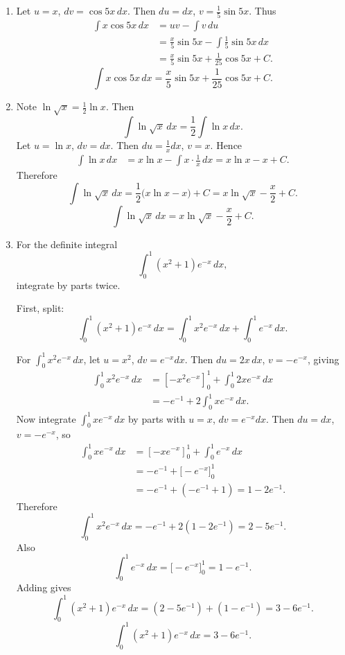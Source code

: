 \documentclass[12pt]{article}
\begin{document}
\begin{enumerate}[label=(\alph*)]
\item Let \(u=x\), \(dv=\cos 5x\,dx\). Then \(du=dx\), \(v=\frac{1}{5}\sin 5x\). Thus
\begin{align*}
\int x\cos 5x\,dx
&= uv-\int v\,du\\
&= \frac{x}{5}\sin 5x - \int \frac{1}{5}\sin 5x\,dx\\
&= \frac{x}{5}\sin 5x + \frac{1}{25}\cos 5x + C.
\end{align*}
\[
\boxed{\displaystyle \int x\cos 5x\,dx = \frac{x}{5}\sin 5x + \frac{1}{25}\cos 5x + C.}
\]

\item Note \(\ln\sqrt{x}=\frac12\ln x\). Then
\[
\int \ln\sqrt{x}\,dx
= \frac{1}{2}\int \ln x\,dx.
\]
Let \(u=\ln x\), \(dv=dx\). Then \(du=\frac{1}{x}dx\), \(v=x\). Hence
\begin{align*}
\int \ln x\,dx
&= x\ln x-\int x\cdot \frac{1}{x}\,dx
= x\ln x - x + C.
\end{align*}
Therefore
\[
\int \ln\sqrt{x}\,dx
= \frac{1}{2}\big(x\ln x - x\big) + C
= x\ln\sqrt{x} - \frac{x}{2} + C.
\]
\[
\boxed{\displaystyle \int \ln\sqrt{x}\,dx = x\ln\sqrt{x} - \frac{x}{2} + C.}
\]

\item For the definite integral
\[
\int_{0}^{1}(x^{2}+1)e^{-x}\,dx,
\]
integrate by parts twice.

First, split:
\[
\int_{0}^{1}(x^{2}+1)e^{-x}\,dx
= \int_{0}^{1}x^{2}e^{-x}\,dx + \int_{0}^{1}e^{-x}\,dx.
\]

For \(\int_{0}^{1}x^{2}e^{-x}\,dx\), let \(u=x^{2}\), \(dv=e^{-x}dx\). Then \(du=2x\,dx\), \(v=-e^{-x}\), giving
\begin{align*}
\int_{0}^{1}x^{2}e^{-x}\,dx
&= \left[-x^{2}e^{-x}\right]_{0}^{1}+\int_{0}^{1}2x e^{-x}\,dx\\
&= -e^{-1}+2\int_{0}^{1}x e^{-x}\,dx.
\end{align*}
Now integrate \(\int_{0}^{1}x e^{-x}\,dx\) by parts with \(u=x\), \(dv=e^{-x}dx\). Then \(du=dx\), \(v=-e^{-x}\), so
\begin{align*}
\int_{0}^{1}x e^{-x}\,dx
&= \left[-x e^{-x}\right]_{0}^{1}+\int_{0}^{1}e^{-x}\,dx\\
&= -e^{-1}+\big[-e^{-x}\big]_{0}^{1}\\
&= -e^{-1}+(-e^{-1}+1)=1-2e^{-1}.
\end{align*}
Therefore
\[
\int_{0}^{1}x^{2}e^{-x}\,dx
= -e^{-1}+2(1-2e^{-1})=2-5e^{-1}.
\]
Also
\[
\int_{0}^{1}e^{-x}\,dx
=\big[-e^{-x}\big]_{0}^{1}
=1-e^{-1}.
\]
Adding gives
\[
\int_{0}^{1}(x^{2}+1)e^{-x}\,dx
=(2-5e^{-1})+(1-e^{-1})
=3-6e^{-1}.
\]
\[
\boxed{\displaystyle \int_{0}^{1}(x^{2}+1)e^{-x}\,dx = 3-6e^{-1}.}
\]


\end{enumerate}
\end{document}
